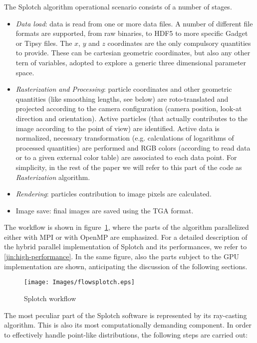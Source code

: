 \documentclass[11pt]{article}
\begin{document}
The Splotch algorithm operational scenario consists of a number of stages. 
\begin{itemize}
\item
{\it Data load}: data is read from one or more data files. A number of different file
formats are supported, from raw binaries, to HDF5 to more specific 
Gadget \cite{gadgeturl} or Tipsy \cite{tipsyurl}
files. The $x$, $y$ and $z$ coordinates are the only compulsory quantities to provide.
These can be cartesian geometric coordinates, but also any other tern 
of variables, adopted to explore a generic three dimensional parameter space.
\item
{\it Rasterization and Processing}: particle coordinates and other geometric quantities 
(like smoothing lengths, see below) are roto-translated and projected according to the 
camera configuration (camera position, look-at direction and orientation). 
Active particles (that actually contributes to the image according to the point of view)
are identified. Active data is normalized, necessary 
transformation (e.g. calculations of logarithms of processed quantities) are performed
and RGB colors (according to read data or to a given
external color table) are associated to each data point. For simplicity, in the rest 
of the paper we will refer to this part of the code as {\it Rasterization} algorithm.
\item
{\it Rendering}: particles contribution to image pixels are calculated.
\item
Image save: final images are saved using the TGA format.
\end{itemize}
The workflow is shown in figure~\ref{fig:workflow}, where the parts of the algorithm parallelized
either with MPI or with OpenMP are emphasized. For a detailed description of
the hybrid parallel implementation of Splotch and its performances, 
we refer to \ref{jin:high-performance}.
In the same figure, also the parts subject to the GPU implementation are shown, 
anticipating the discussion of the following sections.

\begin{figure}
\centering
\texttt{[image: Images/flowsplotch.eps]}
\caption{Splotch workflow}
\label{fig:workflow}
\end{figure}

The most peculiar part of the Splotch software is represented by its ray-casting algorithm.
This is also its most computationally demanding component.
In order to effectively handle point-like distributions, the following 
steps are carried out: 
\end{document}

